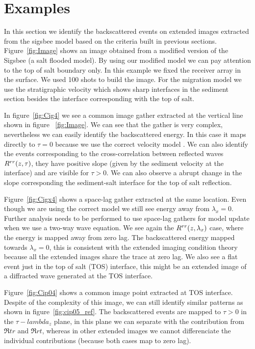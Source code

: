 \section{Examples}

In this section we identify the backscattered events on extended images extracted from the sigsbee model based on
the criteria built in previous sections. Figure~\ref{fig:Image} shows an image obtained from  a modified
version of the Sigsbee (a salt flooded model). By using our modified model we can pay attention to the top
of salt boundary only. In this example we fixed the receiver array in the surface. We used 100 shots to build 
the image. For the migration model we use the stratigraphic
velocity which shows sharp interfaces in the sediment section besides the interface corresponding with the top of salt.

In figure~\ref{fig:Cig4} we see a common image gather extracted at the vertical line shown in figure ~\ref{fig:Image}.
We can see that the gather is very complex, nevertheless we can easily identify the backscattered energy. In this
case it maps directly to $\tau=0$ because we use the correct velocity model .
We can also identify the events corresponding to the cross-correlation between reflected waves $R^{rr}(z,\tau)$, they have positive
slope (given by the sediment velocity at the interface) and are visible for $\tau>0$. We can also observe a abrupt change
in the slope corresponding the sediment-salt interface for the top of salt reflection.

Figure~\ref{fig:Cigx4} shows a space-lag gather extracted at the same location. Even though we are using the correct model 
we still see energy away from $\lambda_x=0$. Further analysis needs to be performed to use space-lag gathers for model update
when we use a two-way wave equation. We see again the $R^{rr}(z,\lambda_x)$ case, where the energy is mapped away from zero lag. 
The backscattered energy mapped towards $\lambda_x=0$, this is consistent with the extended
imaging condition theory because all the extended images share the trace at zero lag. We also see a flat event just in the
top of salt (TOS) interface, this might be an extended image of a diffracted wave generated at the TOS interface.

Figure~\ref{fig:Cip04} shows a common image point extracted at TOS interface. Despite of the complexity of this image, we can still
identify similar patterns as shown in figure~\ref{fig:cip05_ref}. The backscattered events are mapped to $\tau>0$ in the
$\tau-lambda_z$ plane, in this plane we can separate with the contribution from $\Re{tr}$ and $\Re{rt}$, whereas in other extended
images we cannot differenciate the individual contributions (because both cases map to zero lag).





